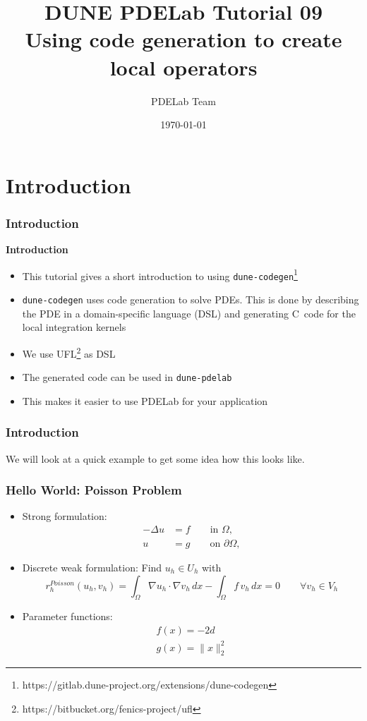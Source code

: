 \documentclass[ignorenonframetext,11pt]{beamer}
\title{DUNE PDELab Tutorial 09\\
  {\small  Using code generation to create local operators}}
\author{PDELab Team}
\institute[]
  {
   Interdisziplinäres Zentrum für Wissenschaftliches Rechnen\\
   Im Neuenheimer Feld 205, D-69120 Heidelberg \\[6pt]
  }
\date[\today]{\today}
\theoremstyle{definition}
\def\CC{{C\nolinebreak[4]\hspace{-.05em}\raisebox{.4ex}{\tiny\bf ++}}}
\begin{document}
\frame{\titlepage}

\section{Introduction}

\begin{frame}[fragile]
  \frametitle{Introduction}
  \textbf{Introduction}
  \begin{itemize}
  \item This tutorial gives a short introduction to using
    \lstinline{dune-codegen}\footnote{https://gitlab.dune-project.org/extensions/dune-codegen}
  \item \lstinline{dune-codegen} uses code generation to solve PDEs. This is
    done by describing the PDE in a domain-specific language (DSL) and
    generating \CC\ code for the local integration kernels
  \item We use UFL\footnote{https://bitbucket.org/fenics-project/ufl} as DSL
  \item The generated code can be used in \lstinline{dune-pdelab}
  \item This makes it easier to use PDELab for your application
  \end{itemize}
\end{frame}

\begin{frame}
  \frametitle{Introduction}
  We will look at a quick example to get some idea how this looks like.
\end{frame}

\begin{frame}
  \frametitle{Hello World: Poisson Problem}

  \begin{itemize}
  \item Strong formulation:
    \begin{align*}
      -\Delta u & = f \qquad\text{in $\Omega$}, \\
      u &= g \qquad\text{on $\partial\Omega$},
    \end{align*}
  \item Discrete weak formulation: Find $u_h \in U_h$ with
    \begin{equation*}
      r_h^{Poisson}(u_h, v_h) = \int_\Omega \nabla u_h \cdot \nabla v_h \, dx
      - \int_\Omega f \, v_h \, dx = 0 \qquad \forall v_h \in V_h
    \end{equation*}
  \item Parameter functions:
    \begin{align*}
      f(x) = -2d \\
      g(x) = \| x \|_2^2
    \end{align*}
  \end{itemize}
\end{frame}
\end{document}
